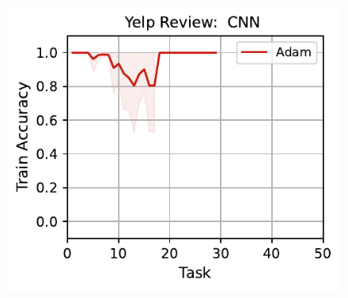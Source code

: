 \begin{figure}[htb!]
{    \includegraphics[width=\textwidth]{figs/Accuracy/nlp/cnn/yelp_review_full_50.pdf}
}
\\
\end{figure}
